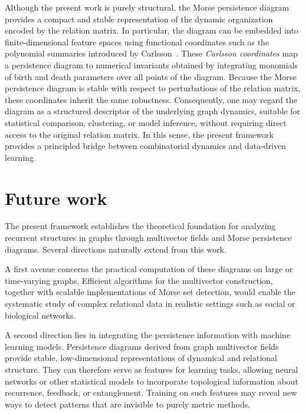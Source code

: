 \documentclass{article}
\theoremstyle{definition}
\theoremstyle{plain}
\theoremstyle{remark}
\newcommand{\1}{\mathbbm{1}}  %
\begin{document}
Although the present work is purely structural, the Morse persistence
diagram provides a compact and stable representation of the dynamic
organization encoded by the relation matrix. In particular, the diagram
can be embedded into finite-dimensional feature spaces using functional
coordinates such as the polynomial summaries introduced by
Carlsson~\cite{adcock2013ring}. These \emph{Carlsson coordinates}
map a persistence diagram to numerical invariants obtained by integrating
monomials of birth and death parameters over all points of the diagram.
Because the Morse persistence diagram is stable with respect to
perturbations of the relation matrix, these coordinates inherit the same
robustness. Consequently, one may regard the diagram as a structured
descriptor of the underlying graph dynamics, suitable for statistical
comparison, clustering, or model inference, without requiring direct
access to the original relation matrix. In this sense, the present
framework provides a principled bridge between combinatorial dynamics and
data-driven learning.







 
 \section{Future work}

The present framework establishes the theoretical foundation for
analyzing recurrent structures in graphs through multivector fields and
Morse persistence diagrams.  Several directions naturally extend from
this work.

A first avenue concerns the practical computation of these diagrams on
large or time-varying graphs.  Efficient algorithms for the multivector
construction, together with scalable implementations of Morse set
detection, would enable the systematic study of complex relational data
in realistic settings such as social or biological networks.

A second direction lies in integrating the persistence information with
machine learning models.  Persistence diagrams derived from graph
multivector fields provide stable, low-dimensional representations of
dynamical and relational structure.  They can therefore serve as
features for learning tasks, allowing neural networks or other
statistical models to incorporate topological information about
recurrence, feedback, or entanglement.  Training on such features may
reveal new ways to detect patterns that are invisible to purely metric
methods.
\end{document}
